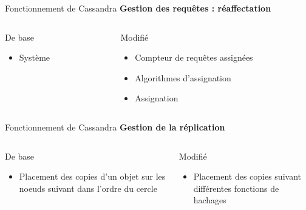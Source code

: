 \documentclass{beamer}
\newcommand{\success}{\color{SuccessGreen}\CheckmarkBold}
\newcommand{\fail}{\color{FailedRed}\XSolidBold}
\begin{document}
\begin{frame}{Fonctionnement de Cassandra}
\textbf{Gestion des requêtes : réaffectation}
\begin{columns}
\begin{column}[c]{5cm}
\begin{block}{De base}
\begin{itemize}
	\item Système 
\end{itemize}
\end{block}
\end{column}

\begin{column}[c]{5cm}
\begin{block}{Modifié}
\begin{itemize}
	\item[\success] Compteur de requêtes assignées
	\item[\fail] Algorithmes d'assignation
	\item[\fail] Assignation
\end{itemize}
\end{block}
\end{column}
\end{columns}
\end{frame}

\begin{frame}{Fonctionnement de Cassandra}
\textbf{Gestion de la réplication}
\begin{columns}
\begin{column}[c]{5cm}
\begin{block}{De base}
\begin{itemize}
	\item Placement des copies d'un objet sur les noeuds suivant dans l'ordre du cercle
\end{itemize}
\end{block}
\end{column}

\begin{column}[c]{5cm}
\begin{block}{Modifié}
\begin{itemize}
	\item[\success] Placement des copies suivant différentes fonctions de hachages
\end{itemize}
\end{block}
\end{column}
\end{columns}
\end{frame}
\end{document}
